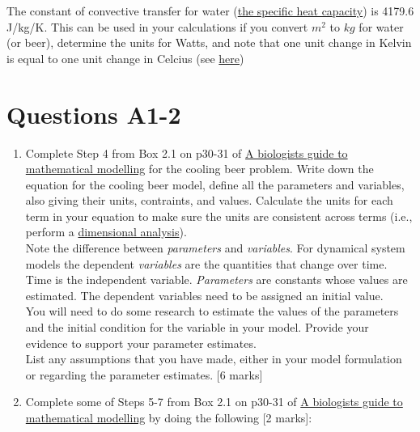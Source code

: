 \documentclass[]{book}
\begin{document}
The constant of convective transfer for water
(\href{https://en.wikipedia.org/wiki/Specific_heat_capacity}{the
specific heat capacity}) is 4179.6 J/kg/K. This can be used in your
calculations if you convert \(m^2\) to \(kg\) for water (or beer),
determine the units for Watts, and note that one unit change in Kelvin
is equal to one unit change in Celcius (see
\href{https://en.wikipedia.org/wiki/Kelvin}{here})

\section{Questions A1-2}\label{questions-a1-2}

\begin{enumerate}
\def\labelenumi{\arabic{enumi}.}
\setcounter{enumi}{4}
\item
  Complete Step 4 from Box 2.1 on p30-31 of
  \href{https://ebookcentral-proquest-com.qe2a-proxy.mun.ca/lib/MUN/detail.action?docID=768551}{A
  biologists guide to mathematical modelling} for the cooling beer
  problem. Write down the equation for the cooling beer model, define
  all the parameters and variables, also giving their units, contraints,
  and values. Calculate the units for each term in your equation to make
  sure the units are consistent across terms (i.e., perform a
  \href{https://en.wikipedia.org/wiki/Dimensional_analysis}{dimensional
  analysis}).\\[2\baselineskip]Note the difference between
  \emph{parameters} and \emph{variables}. For dynamical system models
  the dependent \emph{variables} are the quantities that change over
  time. Time is the independent variable. \emph{Parameters} are
  constants whose values are estimated. The dependent variables need to
  be assigned an initial value.\\[2\baselineskip]You will need to do
  some research to estimate the values of the parameters and the initial
  condition for the variable in your model. Provide your evidence to
  support your parameter estimates.\\
  List any assumptions that you have made, either in your model
  formulation or regarding the parameter estimates. {[}6 marks{]}
\item
  Complete some of Steps 5-7 from Box 2.1 on p30-31 of
  \href{https://ebookcentral-proquest-com.qe2a-proxy.mun.ca/lib/MUN/detail.action?docID=768551}{A
  biologists guide to mathematical modelling} by doing the following
  {[}2 marks{]}:
\end{enumerate}
\end{document}
